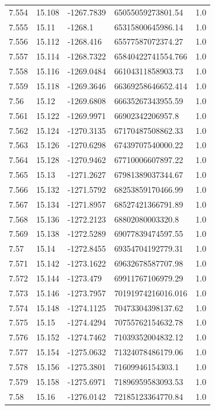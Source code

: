 \begin{tabular}{lllll}
7.554 & 15.108 & -1267.7839 & 65055059273801.54 & 1.0 \\
7.555 & 15.11 & -1268.1 & 65315800645986.14 & 1.0 \\
7.556 & 15.112 & -1268.416 & 65577587072374.27 & 1.0 \\
7.557 & 15.114 & -1268.7322 & 65840422741554.766 & 1.0 \\
7.558 & 15.116 & -1269.0484 & 66104311858903.73 & 1.0 \\
7.559 & 15.118 & -1269.3646 & 66369258646652.414 & 1.0 \\
7.56 & 15.12 & -1269.6808 & 66635267343955.59 & 1.0 \\
7.561 & 15.122 & -1269.9971 & 66902342206957.8 & 1.0 \\
7.562 & 15.124 & -1270.3135 & 67170487508862.33 & 1.0 \\
7.563 & 15.126 & -1270.6298 & 67439707540000.22 & 1.0 \\
7.564 & 15.128 & -1270.9462 & 67710006607897.22 & 1.0 \\
7.565 & 15.13 & -1271.2627 & 67981389037344.67 & 1.0 \\
7.566 & 15.132 & -1271.5792 & 68253859170466.99 & 1.0 \\
7.567 & 15.134 & -1271.8957 & 68527421366791.89 & 1.0 \\
7.568 & 15.136 & -1272.2123 & 68802080003320.8 & 1.0 \\
7.569 & 15.138 & -1272.5289 & 69077839474597.55 & 1.0 \\
7.57 & 15.14 & -1272.8455 & 69354704192779.31 & 1.0 \\
7.571 & 15.142 & -1273.1622 & 69632678587707.98 & 1.0 \\
7.572 & 15.144 & -1273.479 & 69911767106979.29 & 1.0 \\
7.573 & 15.146 & -1273.7957 & 70191974216016.016 & 1.0 \\
7.574 & 15.148 & -1274.1125 & 70473304398137.62 & 1.0 \\
7.575 & 15.15 & -1274.4294 & 70755762154632.78 & 1.0 \\
7.576 & 15.152 & -1274.7462 & 71039352004832.12 & 1.0 \\
7.577 & 15.154 & -1275.0632 & 71324078486179.06 & 1.0 \\
7.578 & 15.156 & -1275.3801 & 71609946154303.1 & 1.0 \\
7.579 & 15.158 & -1275.6971 & 71896959583093.53 & 1.0 \\
7.58 & 15.16 & -1276.0142 & 72185123364770.84 & 1.0 \\

\end{tabular}
